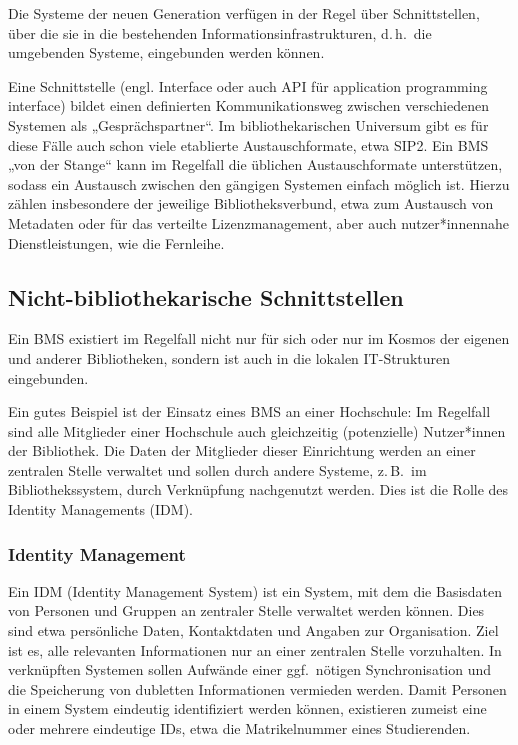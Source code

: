 \documentclass[
  11pt,
  letterpaper,
  DIV=11,
  twoside]{scrreprt}
\begin{document}
Die Systeme der neuen Generation verfügen in der Regel über
Schnittstellen, über die sie in die bestehenden
Informationsinfrastrukturen, d.\,h.~die umgebenden Systeme, eingebunden
werden können.

Eine Schnittstelle (engl. Interface oder auch API für application
programming interface) bildet einen definierten Kommunikationsweg
zwischen verschiedenen Systemen als „Gesprächspartner``. Im
bibliothekarischen Universum gibt es für diese Fälle auch schon viele
etablierte Austauschformate, etwa {SIP2}. Ein BMS „von der Stange`` kann
im Regelfall die üblichen Austauschformate unterstützen, sodass ein
Austausch zwischen den gängigen Systemen einfach möglich ist. Hierzu
zählen insbesondere der jeweilige Bibliotheksverbund, etwa zum Austausch
von Metadaten oder für das verteilte Lizenzmanagement, aber auch
nutzer*innennahe Dienstleistungen, wie die Fernleihe.

\subsection{Nicht-bibliothekarische
Schnittstellen}\label{nicht-bibliothekarische-schnittstellen}

Ein BMS existiert im Regelfall nicht nur für sich oder nur im Kosmos der
eigenen und anderer Bibliotheken, sondern ist auch in die lokalen
IT-Strukturen eingebunden.

Ein gutes Beispiel ist der Einsatz eines BMS an einer Hochschule: Im
Regelfall sind alle Mitglieder einer Hochschule auch gleichzeitig
(potenzielle) Nutzer*innen der Bibliothek. Die Daten der Mitglieder
dieser Einrichtung werden an einer zentralen Stelle verwaltet und sollen
durch andere Systeme, z.\,B.~im Bibliothekssystem, durch Verknüpfung
nachgenutzt werden. Dies ist die Rolle des Identity Managements (IDM).

\subsubsection{Identity Management}\label{identity-management}

Ein IDM (Identity Management System) ist ein System, mit dem die
Basisdaten von Personen und Gruppen an zentraler Stelle verwaltet werden
können. Dies sind etwa persönliche Daten, Kontaktdaten und Angaben zur
Organisation. Ziel ist es, alle relevanten Informationen nur an einer
zentralen Stelle vorzuhalten. In verknüpften Systemen sollen Aufwände
einer ggf.~nötigen Synchronisation und die Speicherung von dubletten
Informationen vermieden werden. Damit Personen in einem System eindeutig
identifiziert werden können, existieren zumeist eine oder mehrere
eindeutige IDs, etwa die Matrikelnummer eines Studierenden.
\end{document}
